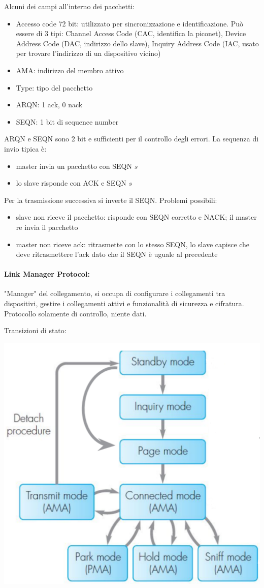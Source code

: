 Alcuni dei campi all'interno dei pacchetti:
\begin{itemize}
    \item Accesso code 72 bit: utilizzato per sincronizzazione e identificazione. Può essere di 3 tipi: Channel Access Code (CAC, identifica la piconet), Device Address Code (DAC, indirizzo dello slave), Inquiry Address Code (IAC, usato per trovare l'indirizzo di un dispositivo vicino)
    
    \item AMA: indirizzo del membro attivo 
    
    \item Type: tipo del pacchetto
    
    \item ARQN: 1 ack, 0 nack
    
    \item SEQN: 1 bit di sequence number
\end{itemize}

ARQN e SEQN sono 2 bit e sufficienti per il controllo degli errori. La sequenza di invio tipica è: 
\begin{itemize}
    \item master invia un pacchetto con SEQN $s$
    
    \item lo slave risponde con ACK e SEQN $s$
\end{itemize}

Per la trasmissione successiva si inverte il SEQN. Problemi possibili: 
\begin{itemize}
    \item slave non riceve il pacchetto: risponde con SEQN corretto e NACK; il master re invia il pacchetto
    
    \item master non riceve ack: ritrasmette con lo stesso SEQN, lo slave capisce che deve ritrasmettere l'ack dato che il SEQN è uguale al precedente
\end{itemize}

\paragraph{Link Manager Protocol:} "Manager" del collegamento, si occupa di configurare i collegamenti tra dispositivi, gestire i collegamenti attivi e funzionalità di sicurezza e cifratura. Protocollo solamente di controllo, niente dati.

Transizioni di stato:
\begin{center}
    \includegraphics[width=0.45\linewidth]{../img/wpan/lmpst}
\end{center}

